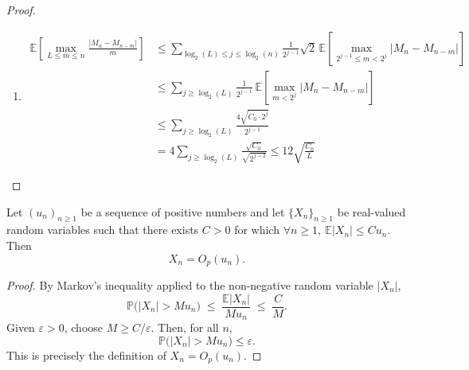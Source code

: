 \begin{proof}
\begin{enumerate}[label=(\roman*)]
		\item \begin{align*}
			\mathbb{E} \left[ \max_{L \leq m \leq n} \frac{|M_n - M_{n - m}|}{m} \right]
			&\leq \sum_{\log_2(L) \leq j \leq \log_2(n)} 
			\frac{1}{2^{j - 1}} \sqrt{2} \, \mathbb{E} \left[ 
			\max_{2^{j - 1} \leq m < 2^j} |M_n - M_{n - m}| \right] \\
			&\leq \sum_{j \geq \log_2(L)} 
			\frac{1}{2^{j - 1}} \, \mathbb{E} \left[ 
			\max_{m < 2^j} |M_n - M_{n - m}| \right] \\
			&\leq \sum_{j \geq \log_2(L)} 
			\frac{4\sqrt{C_0 \cdot 2^j}}{2^{j - 1}} \\
			&= 4\sum_{j \geq \log_2(L)} \frac{\sqrt{C_0}}{\sqrt{2^{j - 2}}}
			\leq 12 \sqrt{\frac{C_0}{L}}	
		\end{align*}
	\end{enumerate}
	
\end{proof}


\begin{lemma}\label{lem:expectation-to-O}
	Let $(u_n)_{n\ge1}$ be a sequence of positive numbers and let $\{X_n\}_{n\ge1}$ be real-valued random variables such that there exists $C>0$ for which \(\forall n \geq 1, \ \mathbb{E}|X_n|\le C u_n\). 
	Then 
	\[X_n = O_p(u_n).\]
\end{lemma}

\begin{proof}
	By Markov's inequality applied to the non-negative random variable $|X_n|$,
	\[
	\mathbb{P}\big(|X_n|> M u_n\big)
	\;\le\; \frac{\mathbb{E}|X_n|}{M u_n}
	\;\le\; \frac{C}{M}.
	\]
	Given $\varepsilon>0$, choose $M\ge C/\varepsilon$. Then, for all $n$,
	\[
	\mathbb{P}\big(|X_n|> M u_n\big)\le \varepsilon.
	\]
	This is precisely the definition of $X_n=O_p(u_n)$.
\end{proof}

